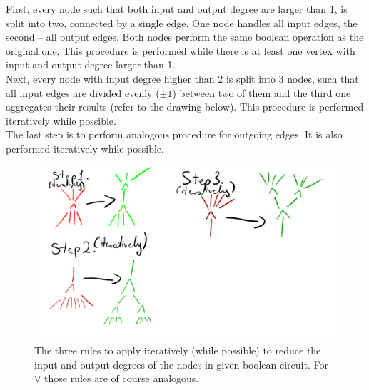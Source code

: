 First, every node such that both input and output degree are larger than 1, is split into two, connected by a single edge.
One node handles all input edges, the second -- all output edges. Both nodes perform the same boolean operation as the original
one. This procedure is performed while there is at least one vertex with input and output degree larger than 1.\\
Next, every node with input degree higher than 2 is split into 3 nodes, such that all input edges are divided evenly ($\pm 1$)
between two of them and the third one aggregates their results (refer to the drawing below). This procedure is performed iteratively
while possible.\\
The last step is to perform analogous procedure for outgoing edges. It is also performed iteratively while possible.
\begin{figure}[H]
      \centering
      \caption{
            The three rules to apply iteratively (while possible) to reduce the input and output degrees of
            the nodes in given boolean circuit. For $\lor$ those rules are of course analogous.
      }
      \includegraphics[scale=0.2]{content/graphics/game17.png}
\end{figure}